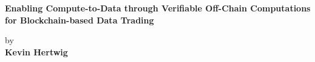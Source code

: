 \begin{titlepage}
\strut
\hfill
\begin{center}
\vspace{1cm}
    \Huge
    \begin{spacing}{.9}
        \textbf{Enabling Compute-to-Data through Verifiable Off-Chain Computations for Blockchain-based Data Trading}\\
    \end{spacing}
    \vspace{0.8cm}
    \large
    by\\
    \vspace{0.8cm}
    \textbf{Kevin Hertwig}\\
    \vspace{0.8cm}

\end{center}
\end{titlepage}
